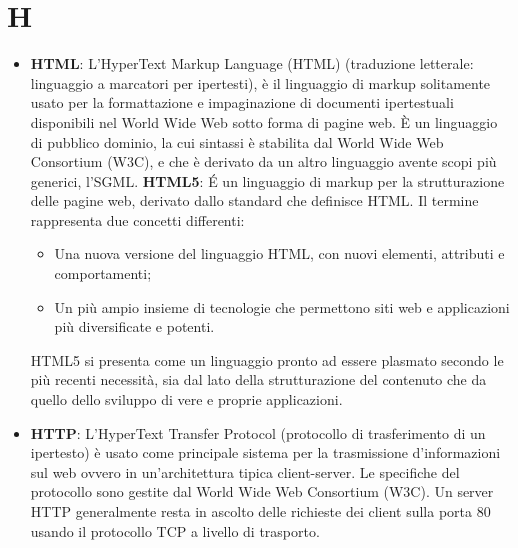 \section{H}
\begin{itemize} 
	\item
	\textbf{HTML}: L'HyperText Markup Language (HTML) (traduzione letterale: linguaggio a marcatori per ipertesti), è il linguaggio di markup solitamente usato per la formattazione e impaginazione di documenti ipertestuali disponibili nel World Wide Web sotto forma di pagine web.
	È un linguaggio di pubblico dominio, la cui sintassi è stabilita dal World Wide Web Consortium (W3C), e che è derivato da un altro linguaggio avente scopi più generici, l'SGML. 
	\textbf{HTML5}: É un linguaggio di markup per la strutturazione delle pagine web, derivato dallo standard che definisce HTML.
	Il termine rappresenta due concetti differenti:
	\begin{itemize}
		\item
		Una nuova versione del linguaggio HTML, con nuovi elementi, attributi e comportamenti;
		\item
		Un più ampio insieme di tecnologie che permettono siti web e applicazioni più diversificate e potenti.
	\end{itemize}
	HTML5 si presenta come un linguaggio pronto ad essere plasmato secondo le più recenti necessità, sia dal lato della strutturazione del contenuto che da quello dello sviluppo di vere e proprie applicazioni.
	\item
	\textbf{HTTP}: L'HyperText Transfer Protocol (protocollo di trasferimento di un ipertesto) è usato come principale sistema per la trasmissione d'informazioni sul web ovvero in un'architettura tipica client-server. Le specifiche del protocollo sono gestite dal World Wide Web Consortium (W3C). Un server HTTP generalmente resta in ascolto delle richieste dei client sulla porta 80 usando il protocollo TCP a livello di trasporto.
\end{itemize}
